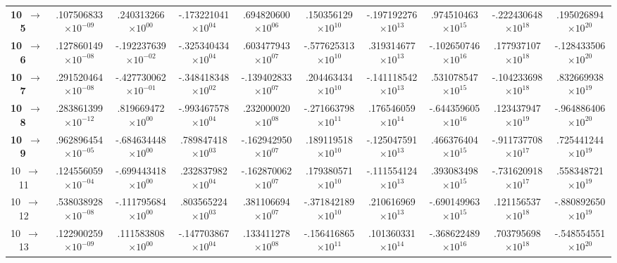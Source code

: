 \documentclass[reviewcopy]{elsarticle}
\begin{document}
\begin{landscape}
\begin{longtable}{lccccccccc}
{\bf 10~$\to$~ 5}   &   .107506833$\times10^{-09}$ &  .240313266$\times10^{ 00}$ & -.173221041$\times10^{ 04}$ &  .694820600$\times10^{ 06}$ &  .150356129$\times10^{ 10}$ & -.197192276$\times10^{ 13}$ & .974510463$\times10^{ 15}$ & -.222430648$\times10^{ 18}$ &  .195026894$\times10^{ 20}$ \\
{\bf 10~$\to$~ 6}   &   .127860149$\times10^{-08}$ & -.192237639$\times10^{-02}$ & -.325340434$\times10^{ 04}$ & .603477943$\times10^{ 07}$ & -.577625313$\times10^{ 10}$ &  .319314677$\times10^{ 13}$ & -.102650746$\times10^{ 16}$ &  .177937107$\times10^{ 18}$ & -.128433506$\times10^{ 20}$ \\
{\bf 10~$\to$~ 7}   &   .291520464$\times10^{-08}$ & -.427730062$\times10^{-01}$ & -.348418348$\times10^{ 02}$ & -.139402833$\times10^{ 07}$ &  .204463434$\times10^{ 10}$ & -.141118542$\times10^{ 13}$ &  .531078547$\times10^{ 15}$ & -.104233698$\times10^{ 18}$ &  .832669938$\times10^{ 19}$ \\
{\bf 10~$\to$~ 8}   &   .283861399$\times10^{-12}$ &  .819669472$\times10^{ 00}$ & -.993467578$\times10^{ 04}$ &  .232000020$\times10^{ 08}$ & -.271663798$\times10^{ 11}$ &  .176546059$\times10^{ 14}$ & -.644359605$\times10^{ 16}$ &  .123437947$\times10^{ 19}$ & -.964886406$\times10^{ 20}$ \\
{\bf 10~$\to$~ 9}   &   .962896454$\times10^{-05}$ & -.684634448$\times10^{ 00}$ &  .789847418$\times10^{ 03}$ & -.162942950$\times10^{ 07}$ &  .189119518$\times10^{ 10}$ & -.125047591$\times10^{ 13}$ &  .466376404$\times10^{ 15}$ & -.911737708$\times10^{ 17}$ &  .725441244$\times10^{ 19}$ \\
 10~$\to$~ 11  &   .124556059$\times10^{-04}$ & -.699443418$\times10^{ 00}$ &  .232837982$\times10^{ 04}$ & -.162870062$\times10^{ 07}$ &  .179380571$\times10^{ 10}$ & -.111554124$\times10^{ 13}$ &  .393083498$\times10^{ 15}$ & -.731620918$\times10^{ 17}$ &  .558348721$\times10^{ 19}$ \\
 10~$\to$~ 12  &   .538038928$\times10^{-08}$ & -.111795684$\times10^{ 00}$ &  .803565224$\times10^{ 03}$ &  .381106694$\times10^{ 07}$ & -.371842189$\times10^{ 10}$ &  .210616969$\times10^{ 13}$ & -.690149963$\times10^{ 15}$ &  .121156537$\times10^{ 18}$ & -.880892650$\times10^{ 19}$ \\
 10~$\to$~ 13  &   .122900259$\times10^{-09}$ &  .111583808$\times10^{ 00}$ & -.147703867$\times10^{ 04}$ &  .133411278$\times10^{ 08}$ & -.156416865$\times10^{ 11}$ &  .101360331$\times10^{ 14}$ & -.368622489$\times10^{ 16}$ &  .703795698$\times10^{ 18}$ & -.548554551$\times10^{ 20}$ \\

\end{longtable}
\end{landscape}
\end{document}
